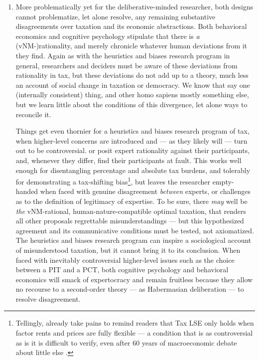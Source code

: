 \begin{enumerate}
	\item More problematically yet for the deliberative-minded researcher, both designs cannot problematize, let alone resolve, any remaining substantive disagreements over taxation and its economic abstractions.
	Both behavioral economics and cognitive psychology stipulate that there is \emph{a} (\gls{vNM}-)rationality, and merely chronicle whatever human deviations from it they find.
	Again as with the heuristics and biases research program in general, researchers and deciders must be aware of these deviations from rationality in tax, but these deviations do not add up to a theory, much less an account of social change in taxation or democracy.
	We know that \citeauthor{VonNeumannMorgenstern1944} say one (internally consistent) thing, and other homo sapiens mostly something else, but we learn little about the conditions of this divergence, let alone ways to reconcile it.
	
	Things get even thornier for a heuristics and biases research program of tax, when higher-level concerns are introduced and --- as they likely will --- turn out to be controversial. 
	\citeauthor{McCafferyBaron2004} or \citeauthor{SausgruberTyran2011} posit expert rationality against their participants, and, whenever they differ, find their participants at fault.
	This works well enough for disentangling percentage and absolute tax burdens, and tolerably for demonstrating a tax-shifting bias\footnote{
	Tellingly, \citeauthor{SausgruberTyran2011} already take pains to remind readers that \gls{Tax LSE} only holds when factor rents and prices are fully flexible --- a condition that is as controversial as is it is difficult to verify, even after 60 years of macroeconomic debate about little else \citep{Wapshott2011}.},
but leaves the researcher empty-handed when faced with genuine disagreement \emph{between} experts, or challenges as to the definition of legitimacy of expertise.
	To be sure, there \emph{may} well be \emph{the} \gls{vNM}-rational, human-nature-compatible optimal taxation, that renders all other proposals regrettable misunderstandings --- but this hypothesized agreement and its communicative conditions must be tested, not axiomatized.
	The heuristics and biases research program can inspire a sociological account of misunderstood taxation, but it cannot bring it to its conclusion.
	When faced with inevitably controversial higher-level issues such as the choice between a \gls{PIT} and a \gls{PCT}, both cognitive psychology and behavioral economics will smack of expertocracy and remain fruitless because they allow no recourse to a second-order theory --- as Habermasian deliberation --- to resolve disagreement.	 
\end{enumerate}


